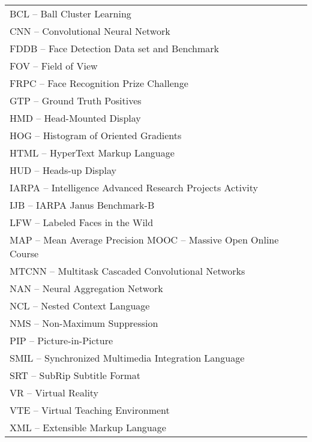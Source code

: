 
\begin{thenotations}
\renewcommand{\arraystretch}{1.5}
  \noindent
  \begin{tabular}{ll}

BCL -- Ball Cluster Learning\\
CNN -- Convolutional Neural Network\\
FDDB -- Face Detection Data set and Benchmark\\
FOV -- Field of View\\
FRPC -- Face Recognition Prize Challenge\\
GTP -- Ground Truth Positives\\
HMD -- Head-Mounted Display\\
HOG -- Histogram of Oriented Gradients\\
HTML -- HyperText Markup Language\\
HUD -- Heads-up Display\\
IARPA -- Intelligence Advanced Research Projects Activity\\
IJB -- IARPA Janus Benchmark-B\\
LFW -- Labeled Faces in the Wild\\
MAP -- Mean Average Precision
MOOC -- Massive Open Online Course\\
MTCNN -- Multitask Cascaded Convolutional Networks\\
NAN -- Neural Aggregation Network\\
NCL -- Nested Context Language\\
NMS -- Non-Maximum Suppression\\
PIP -- Picture-in-Picture\\
SMIL -- Synchronized Multimedia Integration Language\\
SRT -- SubRip Subtitle Format\\
VR -- Virtual Reality\\
VTE -- Virtual Teaching Environment\\
XML -- Extensible Markup Language\\

  \end{tabular}

\end{thenotations}